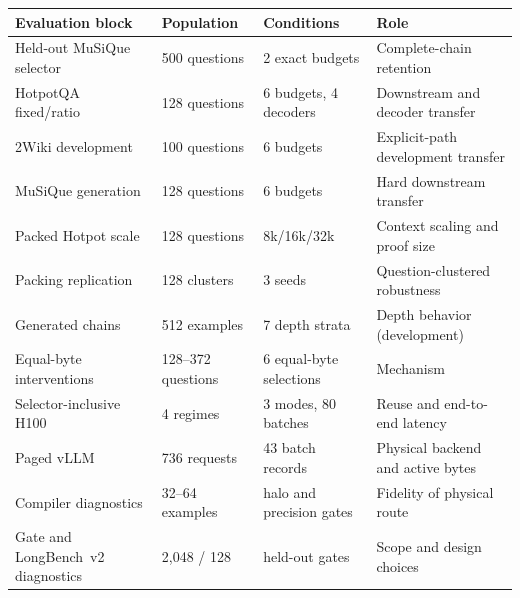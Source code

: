 \begin{tabular}{@{}p{}p{}p{}p{}@{}}
\toprule
Evaluation block & Population & Conditions & Role \\
\midrule
Held-out MuSiQue selector & 500 questions & 2 exact budgets & Complete-chain retention \\
HotpotQA fixed/ratio & 128 questions & 6 budgets, 4 decoders & Downstream and decoder transfer \\
2Wiki development & 100 questions & 6 budgets & Explicit-path development transfer \\
MuSiQue generation & 128 questions & 6 budgets & Hard downstream transfer \\
Packed Hotpot scale & 128 questions & 8k/16k/32k & Context scaling and proof size \\
Packing replication & 128 clusters & 3 seeds & Question-clustered robustness \\
Generated chains & 512 examples & 7 depth strata & Depth behavior (development) \\
Equal-byte interventions & 128--372 questions & 6 equal-byte selections & Mechanism \\
Selector-inclusive H100 & 4 regimes & 3 modes, 80 batches & Reuse and end-to-end latency \\
Paged vLLM & 736 requests & 43 batch records & Physical backend and active bytes \\
Compiler diagnostics & 32--64 examples & halo and precision gates & Fidelity of physical route \\
Gate and LongBench~v2 diagnostics & 2,048 / 128 & held-out gates & Scope and design choices \\
\bottomrule
\end{tabular}
